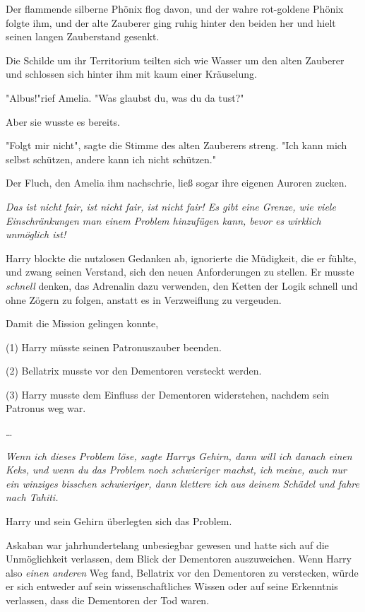 {Der flammende silberne Phönix flog davon, und der wahre rot-goldene Phönix folgte ihm, und der alte Zauberer ging ruhig hinter den beiden her und hielt seinen langen Zauberstand gesenkt.

Die Schilde um ihr Territorium teilten sich wie Wasser um den alten Zauberer und schlossen sich hinter ihm mit kaum einer Kräuselung.

"Albus!"rief Amelia. "Was glaubst du, was du da tust?"

Aber sie wusste es bereits.

"Folgt mir nicht", sagte die Stimme des alten Zauberers streng. "Ich kann mich selbst schützen, andere kann ich nicht schützen."

Der Fluch, den Amelia ihm nachschrie, ließ sogar ihre eigenen Auroren zucken.

\emph{Das ist nicht fair, ist nicht fair, ist nicht fair! Es gibt eine Grenze, wie viele Einschränkungen man einem Problem hinzufügen kann, bevor es wirklich unmöglich ist!}

Harry blockte die nutzlosen Gedanken ab, ignorierte die Müdigkeit, die er fühlte, und zwang seinen Verstand, sich den neuen Anforderungen zu stellen. Er musste \emph{schnell} denken, das Adrenalin dazu verwenden, den Ketten der Logik schnell und ohne Zögern zu folgen, anstatt es in Verzweiflung zu vergeuden.

Damit die Mission gelingen konnte,

(1) Harry müsste seinen Patronuszauber beenden.

(2) Bellatrix musste vor den Dementoren versteckt werden.

(3) Harry musste dem Einfluss der Dementoren widerstehen, nachdem sein Patronus weg war.

…

\emph{\emph{Wenn ich dieses Problem löse,} sagte Harrys Gehirn, \emph{dann will ich danach einen Keks, und wenn} \emph{du} \emph{das Problem noch schwieriger machst, ich meine, auch nur ein} \emph{winziges} \emph{bisschen schwieriger, dann klettere ich aus} \emph{deinem} \emph{Schädel und fahre nach Tahiti.}}

Harry und sein Gehirn überlegten sich das Problem.

Askaban war jahrhundertelang unbesiegbar gewesen und hatte sich auf die Unmöglichkeit verlassen, dem Blick der Dementoren auszuweichen. Wenn Harry also \emph{einen anderen} Weg fand, Bellatrix vor den Dementoren zu verstecken, würde er sich entweder auf sein wissenschaftliches Wissen oder auf seine Erkenntnis verlassen, dass die Dementoren der Tod waren.

}
